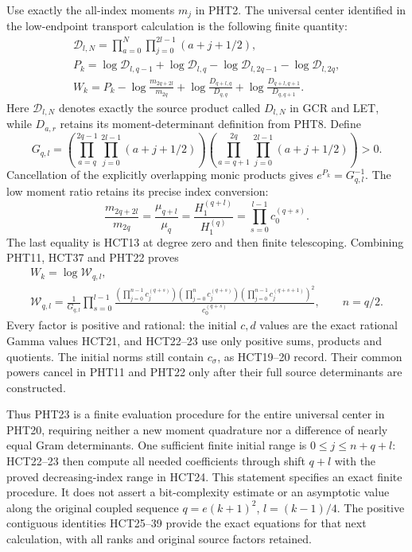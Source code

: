 \documentclass[11pt,a4paper]{article}
\begin{document}
Use exactly the all-index moments $m_j$ in PHT2. The universal
center identified in the low-endpoint transport calculation is
the following finite quantity:
\[
\begin{gathered}
 \mathscr D_{l,N}=\prod_{a=0}^N\prod_{j=0}^{2l-1}(a+j+1/2),\\
 P_k=\log\mathscr D_{l,q-1}+\log\mathscr D_{l,q}
             -\log\mathscr D_{l,2q-1}-\log\mathscr D_{l,2q},\\
 W_k=P_k-\log\frac{m_{2q+2l}}{m_{2q}}
     +\log\frac{D_{q+l,q}}{D_{q,q}}
     +\log\frac{D_{q+l,q+1}}{D_{q,q+1}}.
\end{gathered}\tag{PHT20}
\]
Here $\mathscr D_{l,N}$ denotes exactly the source product
called $D_{l,N}$ in GCR and LET, while $D_{a,r}$ retains
its moment-determinant definition from PHT8. Define
\[
 G_{q,l}=
 \left(\prod_{a=q}^{2q-1}\prod_{j=0}^{2l-1}(a+j+1/2)\right)
 \left(\prod_{a=q+1}^{2q}\prod_{j=0}^{2l-1}(a+j+1/2)\right)>0.
\tag{PHT21}
\]
Cancellation of the explicitly overlapping monic products
gives $e^{P_k}=G_{q,l}^{-1}$. The low moment ratio retains
its precise index conversion:
\[
 \frac{m_{2q+2l}}{m_{2q}}
 =\frac{\mu_{q+l}}{\mu_q}
 =\frac{H_1^{(q+l)}}{H_1^{(q)}}
 =\prod_{s=0}^{l-1}c_0^{(q+s)}.
\tag{PHT22}
\]
The last equality is HCT13 at degree zero and then finite
telescoping. Combining PHT11, HCT37 and PHT22 proves
\[
\begin{gathered}
 W_k=\log\mathcal W_{q,l},\\
 \boxed{\mathcal W_{q,l}=
 \frac1{G_{q,l}}\prod_{s=0}^{l-1}
 \frac{\displaystyle
   \left(\prod_{j=0}^{n-1}c_j^{(q+s)}\right)
   \left(\prod_{j=0}^{n}c_j^{(q+s)}\right)
   \left(\prod_{j=0}^{n-1}c_j^{(q+s+1)}\right)^2}
 {c_0^{(q+s)}},\qquad n=q/2.}
\end{gathered}\tag{PHT23}
\]
Every factor is positive and rational: the initial $c,d$
values are the exact rational Gamma values HCT21, and
HCT22--23 use only positive sums, products and quotients.
The initial norms still contain $c_\sigma$, as HCT19--20
record. Their common powers cancel in PHT11 and PHT22
only after their full source determinants are constructed.

Thus PHT23 is a finite evaluation procedure for the entire
universal center in PHT20, requiring neither a new moment
quadrature nor a difference of nearly equal Gram determinants.
One sufficient finite initial range is $0\leq j\leq n+q+l$:
HCT22--23 then compute all needed coefficients through shift
$q+l$ with the proved decreasing-index range in HCT24.
This statement specifies an exact finite procedure. It does
not assert a bit-complexity estimate or an asymptotic value
along the original coupled sequence $q=e(k+1)^2$, $l=(k-1)/4$.
The positive contiguous identities HCT25--39 provide the
exact equations for that next calculation, with all ranks
and original source factors retained.
\end{document}
